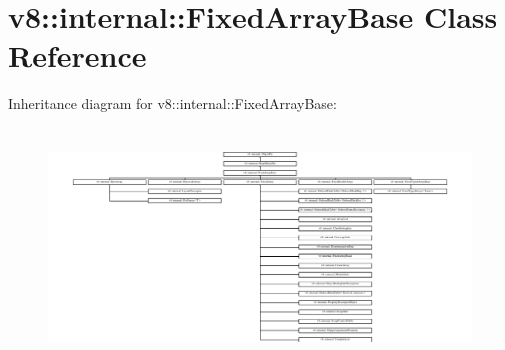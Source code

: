 \hypertarget{classv8_1_1internal_1_1FixedArrayBase}{}\section{v8\+:\+:internal\+:\+:Fixed\+Array\+Base Class Reference}
\label{classv8_1_1internal_1_1FixedArrayBase}
Inheritance diagram for v8\+:\+:internal\+:\+:Fixed\+Array\+Base\+:\begin{figure}[H]
\begin{center}
\leavevmode
\includegraphics[height=6.288770cm]{classv8_1_1internal_1_1FixedArrayBase}
\end{center}
\end{figure}
